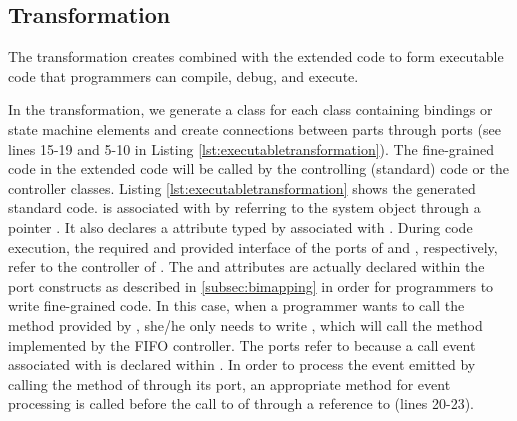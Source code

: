 \subsection{Transformation}
\label{subsec:compilation}
The transformation creates  combined with the extended code to form executable code that programmers can compile, debug, and execute. 



 

In the transformation, we generate a  class for each class containing bindings or state machine elements and create connections between parts through ports (see lines 15-19 and 5-10 in Listing \ref{lst:executabletransformation}).
The fine-grained code in the extended code will be called by the controlling (standard) code or the controller classes.
Listing \ref{lst:executabletransformation} shows the generated standard code.
 is associated with  by referring to the system object through a pointer . 
It also declares a  attribute typed by  associated with .
During code execution, the required and provided interface of the  ports of  and , respectively, refer to the controller of .
The  and  attributes are actually declared within the port constructs as described in \ref{subsec:bimapping} in order for programmers to write fine-grained code.
In this case, when a programmer wants to call the  method provided by , she/he only needs to write , which will call the  method implemented by the FIFO controller.
The  ports refer to  because a call event associated with  is declared within . 
In order to process the event emitted by calling the  method of  through its  port, an appropriate method for event processing is called before the call to  of  through a reference to  (lines 20-23).

